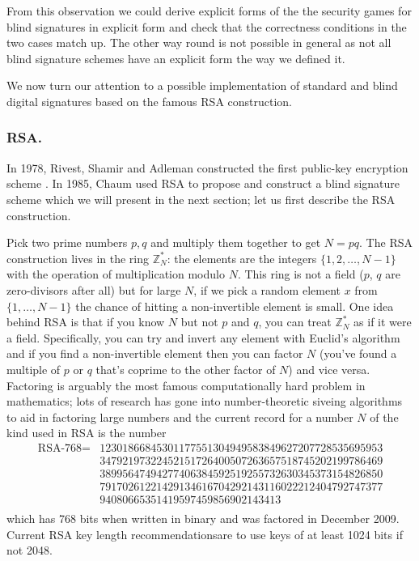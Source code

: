 \documentclass{llncs}
\begin{document}
From this observation we could derive explicit forms of the the security games
for blind signatures in explicit form and check that the correctness conditions
in the two cases match up. The other way round is not possible in general as not
all blind signature schemes have an explicit form the way we defined it.

We now turn our attention to a possible implementation of standard and blind
digital signatures based on the famous RSA construction.

\subsubsection{RSA.}
In 1978, Rivest, Shamir and Adleman constructed the first public-key encryption
scheme \cite{RSA78}. In 1985, Chaum used RSA to propose and construct a blind
signature scheme which we will present in the next section; let us first
describe the RSA construction.

Pick two prime numbers $p, q$ and multiply them together to get $N = pq$. The
RSA construction lives in the ring $\mathbb Z^*_N$: the elements are the
integers $\{1, 2, \ldots, N-1\}$ with the operation of multiplication modulo
$N$. This ring is not a field ($p$, $q$ are zero-divisors after all) but for
large $N$, if we pick a random element $x$ from $\{1, \ldots, N-1\}$ the chance
of hitting a non-invertible element is small. One idea behind RSA is that if you
know $N$ but not $p$ and $q$, you can treat $\mathbb Z^*_N$ as if it were a
field. Specifically, you can try and invert any element with Euclid's algorithm
and if you find a non-invertible element then you can factor $N$ (you've found a
multiple of $p$ or $q$ that's coprime to the other factor of $N$) and vice
versa. Factoring is arguably the most famous computationally hard problem in
mathematics; lots of research has gone into number-theoretic siveing algorithms
to aid in factoring large numbers and the current record for a number $N$ of the
kind used in RSA is the number 
\[\begin{array}{rl}
\textrm{RSA-768} = & 
12301866845301177551304949583849627207728535695953 \\ &
34792197322452151726400507263657518745202199786469 \\ &
38995647494277406384592519255732630345373154826850 \\ &
79170261221429134616704292143116022212404792747377 \\ &
94080665351419597459856902143413 \\
\end{array}\]
which has 768 bits when written in binary and was factored in December 2009.
Current RSA key length recommendations\footnotemark are to use keys of at least
1024 bits if not 2048.
\end{document}
